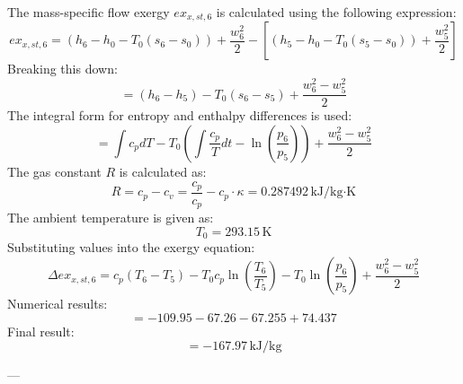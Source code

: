 The mass-specific flow exergy \( ex_{x,st,6} \) is calculated using the following expression:  
\[
ex_{x,st,6} = (h_6 - h_0 - T_0(s_6 - s_0)) + \frac{w_6^2}{2} - \left[(h_5 - h_0 - T_0(s_5 - s_0)) + \frac{w_5^2}{2}\right]
\]  
Breaking this down:  
\[
= (h_6 - h_5) - T_0(s_6 - s_5) + \frac{w_6^2 - w_5^2}{2}
\]  
The integral form for entropy and enthalpy differences is used:  
\[
= \int c_p dT - T_0 \left(\int \frac{c_p}{T} dt - \ln\left(\frac{p_6}{p_5}\right)\right) + \frac{w_6^2 - w_5^2}{2}
\]  
The gas constant \( R \) is calculated as:  
\[
R = c_p - c_v = \frac{c_p}{c_p} - c_p \cdot \kappa = 0.287492 \, \text{kJ/kg·K}
\]  
The ambient temperature is given as:  
\[
T_0 = 293.15 \, \text{K}
\]  
Substituting values into the exergy equation:  
\[
\Delta ex_{x,st,6} = c_p(T_6 - T_5) - T_0 c_p \ln\left(\frac{T_6}{T_5}\right) - T_0 \ln\left(\frac{p_6}{p_5}\right) + \frac{w_6^2 - w_5^2}{2}
\]  
Numerical results:  
\[
= -109.95 - 67.26 - 67.255 + 74.437
\]  
Final result:  
\[
= -167.97 \, \text{kJ/kg}
\]  

---